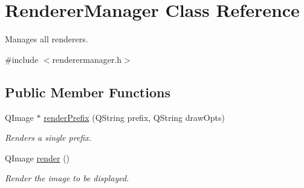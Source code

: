 \hypertarget{classRendererManager}{
\section{\-Renderer\-Manager \-Class \-Reference}
\label{classRendererManager}
}


\-Manages all renderers.  




{\ttfamily \#include $<$renderermanager.\-h$>$}

\subsection*{\-Public \-Member \-Functions}
\begin{DoxyCompactItemize}
\item 
\-Q\-Image $\ast$ \hyperlink{classRendererManager_a0e1583d8e697750bde319965217516e1}{render\-Prefix} (\-Q\-String prefix, \-Q\-String draw\-Opts)
\begin{DoxyCompactList}\small\item\em \-Renders a single prefix. \end{DoxyCompactList}\item 
\-Q\-Image \hyperlink{classRendererManager_af6ac3aae69f06f316c933cea36a2023e}{render} ()
\begin{DoxyCompactList}\small\item\em \-Render the image to be displayed. \end{DoxyCompactList}\end{DoxyCompactItemize}
